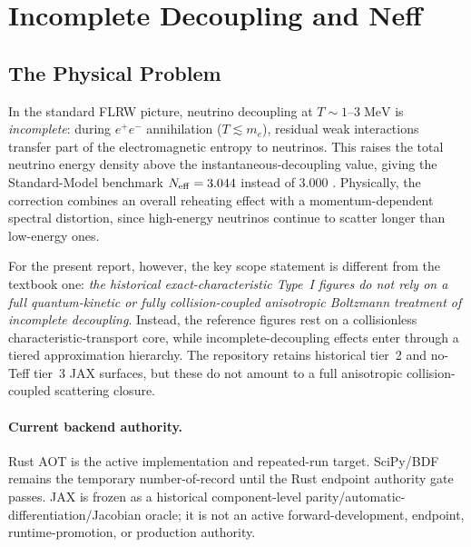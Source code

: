 \section{Incomplete Decoupling and Neff}\label{sec:incomplete_decoupling}

\subsection{The Physical Problem}

In the standard FLRW picture, neutrino decoupling at $T \sim 1$--$3\;\mathrm{MeV}$ is \emph{incomplete}: during $e^+e^-$ annihilation ($T \lesssim m_e$), residual weak interactions transfer part of the electromagnetic entropy to neutrinos.  This raises the total neutrino energy density above the instantaneous-decoupling value, giving the Standard-Model benchmark $N_{\rm eff} = 3.044$ instead of $3.000$ \cite{Mangano2005, deSalas2016, Froustey2020, Bennett2020}.  Physically, the correction combines an overall reheating effect with a momentum-dependent spectral distortion, since high-energy neutrinos continue to scatter longer than low-energy ones.

For the present report, however, the key scope statement is different from the textbook one: \emph{the historical exact-characteristic Type~I figures do not rely on a full quantum-kinetic or fully collision-coupled anisotropic Boltzmann treatment of incomplete decoupling}.  Instead, the reference figures rest on a collisionless characteristic-transport core, while incomplete-decoupling effects enter through a tiered approximation hierarchy.  The repository retains historical tier~2 and no-Teff tier~3 JAX surfaces, but these do not amount to a full anisotropic collision-coupled scattering closure.

\paragraph{Current backend authority.} Rust AOT is the active implementation and repeated-run target.  SciPy/BDF remains the temporary number-of-record until the Rust endpoint authority gate passes.  JAX is frozen as a historical component-level parity/automatic-differentiation/Jacobian oracle; it is not an active forward-development, endpoint, runtime-promotion, or production authority.


